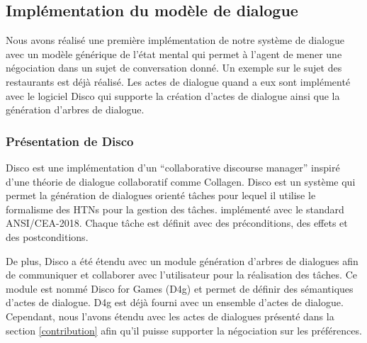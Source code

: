 \documentclass [french]{sig-alternate-05-2015}
\begin{document}
\subsection{Implémentation du modèle de dialogue}

\par Nous avons réalisé une première implémentation de notre système de dialogue avec un modèle générique de l'état mental qui permet à l'agent de mener une négociation dans un sujet de conversation donné. Un exemple sur le sujet des restaurants est déjà réalisé. Les actes de dialogue quand a eux sont implémenté avec le logiciel Disco \cite{rich2009building} qui supporte la création d'actes de dialogue ainsi que la génération d'arbres de dialogue.

\subsubsection{Présentation de Disco}
Disco est une implémentation d'un ``collaborative discourse manager'' inspiré d'une théorie de dialogue collaboratif comme Collagen.  Disco est un système qui permet la génération de dialogues orienté tâches pour lequel il utilise le formalisme des HTNs pour la gestion des tâches. implémenté avec le standard ANSI/CEA-2018.
Chaque tâche est définit avec des préconditions, des effets et des postconditions. 
\par De plus, Disco a été étendu avec un module génération d'arbres de dialogues afin de communiquer et collaborer avec l'utilisateur pour la réalisation des tâches. Ce module est nommé Disco for Games (D4g) et permet de définir des sémantiques d'actes de dialogue. D4g est déjà fourni avec un ensemble d'actes de dialogue. Cependant, nous l'avons étendu avec les actes de dialogues présenté dans la section \ref{contribution} afin qu'il puisse supporter la négociation sur les préférences. 
\end{document}

